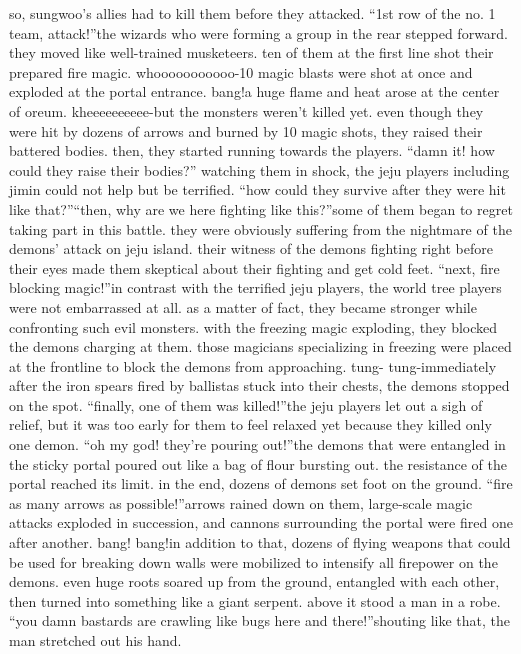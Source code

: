 so, sungwoo’s allies had to kill them before they attacked.
“1st row of the no.
 1 team, attack!”the wizards who were forming a group in the rear stepped forward.
 they moved like well-trained musketeers.
 ten of them at the first line shot their prepared fire magic.
whooooooooooo-10 magic blasts were shot at once and exploded at the portal entrance.
bang!a huge flame and heat arose at the center of oreum.
kheeeeeeeeee-but the monsters weren’t killed yet.
 even though they were hit by dozens of arrows and burned by 10 magic shots, they raised their battered bodies.
 then, they started running towards the players.
“damn it! how could they raise their bodies?”
watching them in shock, the jeju players including jimin could not help but be terrified.
“how could they survive after they were hit like that?”“then, why are we here fighting like this?”some of them began to regret taking part in this battle.
 they were obviously suffering from the nightmare of the demons’ attack on jeju island.
 their witness of the demons fighting right before their eyes made them skeptical about their fighting and get cold feet.
“next, fire blocking magic!”in contrast with the terrified jeju players, the world tree players were not embarrassed at all.
 as a matter of fact, they became stronger while confronting such evil monsters.
with the freezing magic exploding, they blocked the demons charging at them.
 those magicians specializing in freezing were placed at the frontline to block the demons from approaching.
tung- tung-immediately after the iron spears fired by ballistas stuck into their chests, the demons stopped on the spot.
“finally, one of them was killed!”the jeju players let out a sigh of relief, but it was too early for them to feel relaxed yet because they killed only one demon.
“oh my god! they’re pouring out!”the demons that were entangled in the sticky portal poured out like a bag of flour bursting out.
the resistance of the portal reached its limit.
 in the end, dozens of demons set foot on the ground.
“fire as many arrows as possible!”arrows rained down on them, large-scale magic attacks exploded in succession, and cannons surrounding the portal were fired one after another.
bang! bang!in addition to that, dozens of flying weapons that could be used for breaking down walls were mobilized to intensify all firepower on the demons.
 even huge roots soared up from the ground, entangled with each other, then turned into something like a giant serpent.
 above it stood a man in a robe.
“you damn bastards are crawling like bugs here and there!”shouting like that, the man stretched out his hand.
